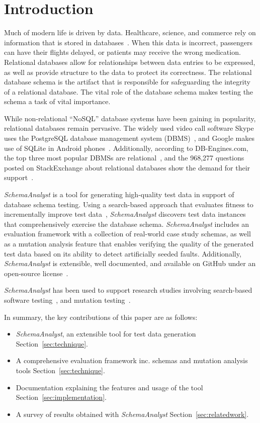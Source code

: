 \section{Introduction}\label{sec:intro}

Much of modern life is driven by data.  Healthcare, science, and commerce rely on information that is
stored in databases~\cite{kapfhammer2007comprehensive}.  When this data is incorrect, passengers can have
their flights delayed, or patients may receive the wrong medication.
Relational databases allow for relationships between data entries to be expressed, as well as provide structure to
the data to protect its correctness. The relational database schema is the artifact
that is responsible for safeguarding the integrity of a relational database. The vital role of the database
schema makes testing the schema a task of vital importance.

While non-relational ``NoSQL'' database systems have been gaining in popularity, relational databases remain
pervasive. The widely used video call software Skype uses the PostgreSQL database management system
(DBMS)~\cite{postgres},
and Google makes use of SQLite in Android phones~\cite{sqlite}.
Additionally, according to DB-Engines.com, the top three most popular DBMSs are
relational~\cite{dbrank}, and the 968,277 questions posted on StackExchange
about relational databases show the demand for their support~\cite{stackexchange}.

\textit{SchemaAnalyst} is a tool for generating high-quality test data in support of database schema
testing. Using a search-based approach that evaluates fitness to incrementally improve test data~\cite{Korel:AVM},
\textit{SchemaAnalyst} discovers test data instances that comprehensively exercise the database schema.
\textit{SchemaAnalyst} includes an evaluation framework
with a collection of real-world case study schemas, as well as a mutation analysis feature
that enables verifying the quality of the generated test data based on its ability to detect artificially
seeded faults. Additionally, \textit{SchemaAnalyst}
is extensible, well documented, and available on GitHub under an open-source license~\cite{tool}.

\textit{SchemaAnalyst} has been used to support research studies involving search-based
software testing~\cite{kapfhammer2013search,mcminn2015effectiveness,kinneer2015automatically}, and
mutation testing~\cite{wright2013efficient,wright2014impact,wright2015mutation,mcminn2016virtual}.

In summary, the key contributions of this paper are as follows:

\begin{itemize}
\item \textit{SchemaAnalyst}, an extensible tool for test data generation Section~\ref{sec:technique}.
\item A comprehensive evaluation framework inc. schemas and mutation analysis tools Section~\ref{sec:technique}.
\item Documentation explaining the features and usage of the tool Section~\ref{sec:implementation}.
\item A survey of results obtained with \textit{SchemaAnalyst} Section~\ref{sec:relatedwork}.
\end{itemize}
